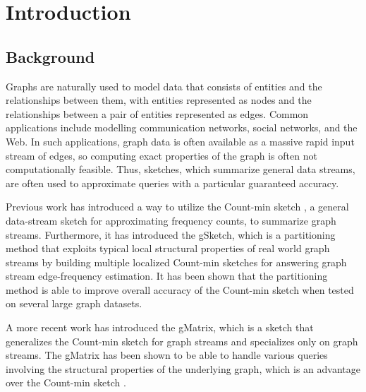 
\chapter{Introduction}  %

\ifpdf
    \graphicspath{{Chapter1/Figs/Raster/}{Chapter1/Figs/PDF/}{Chapter1/Figs/}}
\else
    \graphicspath{{Chapter1/Figs/Vector/}{Chapter1/Figs/}}
\fi


\section{Background} %

Graphs are naturally used to model data that consists of entities and the relationships between them, with entities represented as nodes and the relationships between a pair of entities represented as edges. Common applications include modelling communication networks, social networks, and the Web. In such applications, graph data is often available as a massive rapid input stream of edges, so computing exact properties of the graph is often not computationally feasible. Thus, sketches, which summarize general data streams, are often used to approximate queries with a particular guaranteed accuracy.

Previous work \cite{DBLP} has introduced a way to utilize the Count-min sketch \cite{cormode2005improved}, a general data-stream sketch for approximating frequency counts, to summarize graph streams. Furthermore, it \cite{DBLP} has introduced the gSketch, which is a partitioning method that exploits typical local structural properties of real world graph streams by building multiple localized Count-min sketches \cite{cormode2005improved} for answering graph stream edge-frequency estimation. It has been shown that the partitioning method is able to improve overall accuracy of the Count-min sketch when tested on several large graph datasets.

A more recent work \cite{khan} has introduced the gMatrix, which is a sketch that generalizes the Count-min sketch for graph streams and specializes only on graph streams. The gMatrix has been shown to be able to handle various queries involving the structural properties of the underlying graph, which is an advantage over the Count-min sketch \cite{DBLP}.

